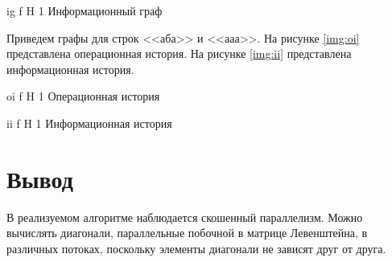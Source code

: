 {ig} %
{f} %
{H} %
{1\textwidth} %
{Информационный граф} %


Приведем графы для строк <<аба>> и <<ааа>>. На рисунке \ref{img:oi} представлена операционная история. На рисунке \ref{img:ii} представлена информационная история.

{oi} %
{f} %
{H} %
{1\textwidth} %
{Операционная история} %


{ii} %
{f} %
{H} %
{1\textwidth} %
{Информационная история} %

\section*{Вывод}

В реализуемом алгоритме наблюдается скошенный параллелизм. Можно вычислять диагонали, параллельные побочной в матрице Левенштейна, в различных потоках, поскольку элементы диагонали не зависят друг от друга.
